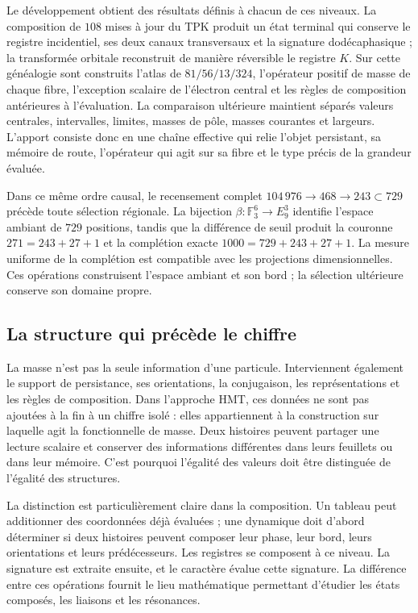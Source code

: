 Le développement obtient des résultats définis à chacun de ces niveaux. La
composition de \(108\) mises à jour du TPK produit un état terminal
qui conserve le registre incidentiel, ses deux canaux transversaux et la signature
dodécaphasique ; la transformée orbitale reconstruit de manière réversible le registre
\(K\). Sur cette généalogie sont construits l’atlas de
\(81/56/13/324\), l’opérateur positif de masse de chaque fibre, l’exception
scalaire de l’électron central et les règles de composition antérieures à
l’évaluation. La comparaison ultérieure maintient séparés valeurs centrales,
intervalles, limites, masses de pôle, masses courantes et largeurs. L’apport
consiste donc en une chaîne effective qui relie l’objet persistant,
sa mémoire de route, l’opérateur qui agit sur sa fibre et le type précis de
la grandeur évaluée.


Dans ce même ordre causal, le recensement complet
\(104\,976\to468\to243\subset729\) précède toute sélection régionale. La
bijection \(\beta:\mathbb F_3^6\to E_9^3\) identifie l’espace ambiant de
\(729\) positions, tandis que la différence de seuil produit la couronne
\(271=243+27+1\) et la complétion exacte
\(1000=729+243+27+1\). La mesure uniforme de la complétion est compatible
avec les projections dimensionnelles. Ces opérations construisent l’espace ambiant
et son bord ; la sélection ultérieure conserve son domaine propre.


\subsection{La structure qui précède le chiffre
}

La masse n’est pas la seule information d’une particule. Interviennent également
le support de persistance, ses orientations, la conjugaison, les
représentations et les règles de composition. Dans l’approche HMT,
ces données ne sont pas ajoutées à la fin à un chiffre isolé : elles appartiennent à la
construction sur laquelle agit la fonctionnelle de masse. Deux histoires peuvent
partager une lecture scalaire et conserver des informations différentes dans leurs
feuillets ou dans leur mémoire. C’est pourquoi l’égalité des valeurs doit être distinguée
de l’égalité des structures.


La distinction est particulièrement claire dans la composition. Un tableau peut
additionner des coordonnées déjà évaluées ; une dynamique doit d’abord déterminer si deux
histoires peuvent composer leur phase, leur bord, leurs orientations et leurs
prédécesseurs. Les registres se composent à ce niveau. La signature est extraite
ensuite, et le caractère évalue cette signature. La différence entre ces
opérations fournit le lieu mathématique permettant d’étudier les états composés,
les liaisons et les résonances.


